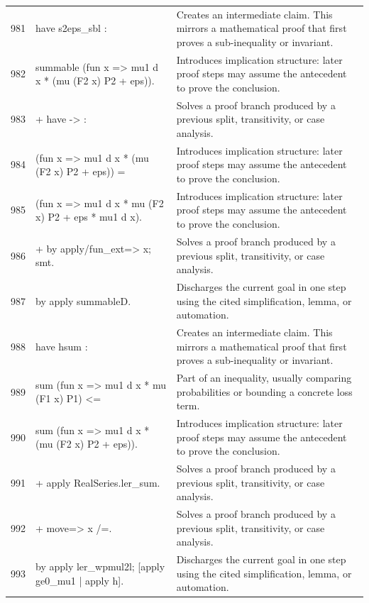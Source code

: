 \documentclass[10pt]{article}
\begin{document}
\begin{longtable}{r L{0.53\textwidth} L{0.37\textwidth}}
981 & {\ttfamily\scriptsize have s2eps\_sbl :} & Creates an intermediate claim.  This mirrors a mathematical proof that first proves a sub-inequality or invariant. \\
982 & {\ttfamily\scriptsize   summable (fun x => mu1 d x * (mu (F2 x) P2 + eps)).} & Introduces implication structure: later proof steps may assume the antecedent to prove the conclusion. \\
983 & {\ttfamily\scriptsize + have -> :} & Solves a proof branch produced by a previous split, transitivity, or case analysis. \\
984 & {\ttfamily\scriptsize     (fun x => mu1 d x * (mu (F2 x) P2 + eps)) =} & Introduces implication structure: later proof steps may assume the antecedent to prove the conclusion. \\
985 & {\ttfamily\scriptsize     (fun x => mu1 d x * mu (F2 x) P2 + eps * mu1 d x).} & Introduces implication structure: later proof steps may assume the antecedent to prove the conclusion. \\
986 & {\ttfamily\scriptsize   + by apply/fun\_ext=> x; smt.} & Solves a proof branch produced by a previous split, transitivity, or case analysis. \\
987 & {\ttfamily\scriptsize   by apply summableD.} & Discharges the current goal in one step using the cited simplification, lemma, or automation. \\
988 & {\ttfamily\scriptsize have hsum :} & Creates an intermediate claim.  This mirrors a mathematical proof that first proves a sub-inequality or invariant. \\
989 & {\ttfamily\scriptsize   sum (fun x => mu1 d x * mu (F1 x) P1) <=} & Part of an inequality, usually comparing probabilities or bounding a concrete loss term. \\
990 & {\ttfamily\scriptsize   sum (fun x => mu1 d x * (mu (F2 x) P2 + eps)).} & Introduces implication structure: later proof steps may assume the antecedent to prove the conclusion. \\
991 & {\ttfamily\scriptsize + apply RealSeries.ler\_sum.} & Solves a proof branch produced by a previous split, transitivity, or case analysis. \\
992 & {\ttfamily\scriptsize   + move=> x /=.} & Solves a proof branch produced by a previous split, transitivity, or case analysis. \\
993 & {\ttfamily\scriptsize     by apply ler\_wpmul2l; [apply ge0\_mu1 | apply h].} & Discharges the current goal in one step using the cited simplification, lemma, or automation. \\

\end{longtable}
\end{document}
